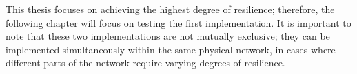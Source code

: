 This thesis focuses on achieving the highest degree of resilience; therefore, the following chapter will focus on testing the first implementation. It is important to note that these two implementations are not mutually exclusive; they can be implemented simultaneously within the same physical network, in cases where different parts of the network require varying degrees of resilience.